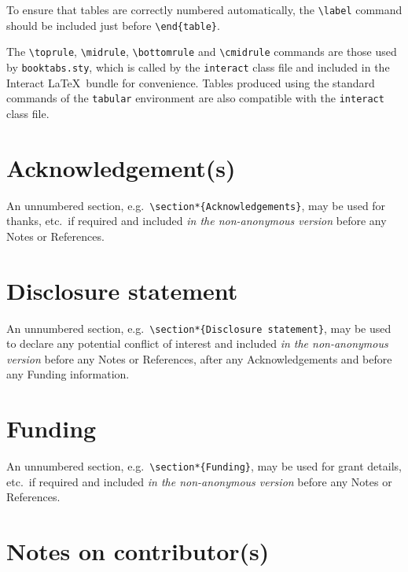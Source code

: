 \documentclass[]{interact}
\theoremstyle{plain}%
\theoremstyle{definition}
\theoremstyle{remark}
\begin{document}
To ensure that tables are correctly numbered automatically, the \verb"\label" command should be included just before \verb"\end{table}".

The \verb"\toprule", \verb"\midrule", \verb"\bottomrule" and \verb"\cmidrule" commands are those used by \verb"booktabs.sty", which is called by the \texttt{interact} class file and included in the \textsf{Interact} \LaTeX\ bundle for convenience. Tables produced using the standard commands of the \texttt{tabular} environment are also compatible with the \texttt{interact} class file.


\section*{Acknowledgement(s)}

An unnumbered section, e.g.\ \verb"\section*{Acknowledgements}", may be used for thanks, etc.\ if required and included \emph{in the non-anonymous version} before any Notes or References.


\section*{Disclosure statement}

An unnumbered section, e.g.\ \verb"\section*{Disclosure statement}", may be used to declare any potential conflict of interest and included \emph{in the non-anonymous version} before any Notes or References, after any Acknowledgements and before any Funding information.


\section*{Funding}

An unnumbered section, e.g.\ \verb"\section*{Funding}", may be used for grant details, etc.\ if required and included \emph{in the non-anonymous version} before any Notes or References.


\section*{Notes on contributor(s)}
\end{document}
